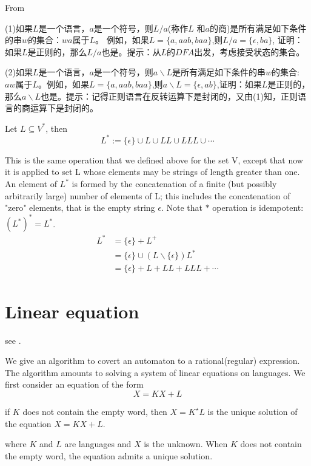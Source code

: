 \clearpage

From \cite[p99]{Hopcroft2008}

(1)如果$L$是一个语言，$a$是一个符号，则$L/a$(称作$L$ 和$a$的商)是所有满足如下条件的串$w$的集合：$wa$属于$L$。
例如，如果$L=\{a,aab,baa\}$,则$L/a = \{\epsilon,ba\}$, 证明：如果$L$是正则的，那么$L/a$也是。提示：从$L$的$DFA$出发，考虑接受状态的集合。

(2)如果$L$是一个语言，$a$是一个符号，则$a\backslash L$是所有满足如下条件的串$w$的集合: $aw$属于$L$。例如，如果$L=\{a,aab,baa\}$,则$a\backslash L=\{\epsilon,ab\}$,证明：如果$L$是正则的，那么$a\backslash L$也是。提示：记得正则语言在反转运算下是封闭的，又由(1)知，正则语言的商运算下是封闭的。

\begin{definition}
	Let $L\subseteq V^{\ast}$, then
	$$L^{\ast} := \{\epsilon\}\cup L \cup LL\cup LLL\cup \cdots$$
\end{definition}

This is the same operation that we defined above for the set V, except that now it is applied to set L whose elements may be strings of length greater than one. An element of $L^*$ is formed by the concatenation of a finite (but possibly arbitrarily large) number of elements of L; this includes the concatenation of "zero" elements, that is the empty string $\epsilon$. Note that $\ast$ operation is idempotent: ${(L^*)}^* = L^*$.
\begin{align*}
L^{\ast} &= \{\epsilon\} +L^{+} \\
&=  \{\epsilon\}\cup (L\backslash \{\epsilon\})L^{\ast}\\ &=\{\epsilon\} + L + LL + LLL + \cdots
\end{align*}

\section{Linear equation}

see \cite[5.3,p64]{Jean2018}.

We give an algorithm to covert an automaton to a rational(regular) expression. The algorithm amounts to solving a system of linear equations on languages. We first consider an equation of the form
\begin{equation}\label{Linear equation}
X = KX + L
\end{equation}

\begin{proposition}
	if $K$ does not contain the empty word, then $X = K^\star L$ is the unique solution of the equation $X = KX + L$.
\end{proposition}
where $K$ and $L$ are languages and $X$ is the unknown. When $K$ does not contain the empty word, the equation admits a unique solution.

